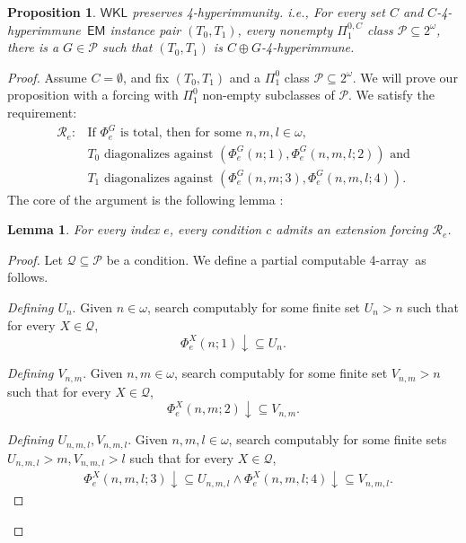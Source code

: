 \documentclass{amsart}
\newtheorem{lemma}[theorem]{Lemma}
\newtheorem{proposition}[theorem]{Proposition}
\theoremstyle{definition}
\theoremstyle{remark}
\numberwithin{equation}{section}
\theoremstyle{noparens}
\def\msf{\mathsf}
\def\mcal{\mathcal}
\def\iatfs{array}
\def\iatfshyp{4-hyperimmune}
\def\propiatfshyp{4-hyperimmunity}
\def\diagonalagainst{diagonalizes against}
\begin{document}
\begin{proposition}\label{uemprop2}
$\msf{WKL}$ preserves \propiatfshyp. i.e.,
For every set $C$ and $C$-\iatfshyp\ $\msf{EM}$
instance pair $(T_0,T_1)$,
 every nonempty $\Pi_1^{0,C}$ class
$\mcal{P}\subseteq 2^\omega$,
there is a $G\in\mcal{P}$ such that
$(T_0,T_1)$ is $C\oplus G$-\iatfshyp.

\end{proposition}
\begin{proof}
Assume $C = \emptyset$, and fix $(T_0, T_1)$ and a $\Pi^0_1$ class $\mcal{P} \subseteq 2^\omega$.
We will prove our proposition with a forcing with $\Pi^0_1$ non-empty subclasses of $\mcal{P}$. We satisfy the requirement:
\begin{align}\nonumber
\mcal{R}_e: & \text{If }\Phi_e^G\text{ is total, then for
some $n,m,l \in \omega$, }\\ \nonumber
& T_0\text{ \diagonalagainst\ $(\Phi_e^G(n;1),\Phi_e^G(n,m,l;2))$ and}\\ \nonumber
&\text{$T_1$ \diagonalagainst\ $(\Phi_e^G(n,m;3),\Phi_e^G(n,m,l;4))$.}
\end{align}
The core of the argument is the following lemma :

\begin{lemma}\label{lem:uemprop2-preserve}
For every index $e$, every condition $c$
 admits an extension forcing $\mcal{R}_e$.
\end{lemma}
\begin{proof}
Let $\mcal{Q} \subseteq \mcal{P}$ be a condition.
We  define %
 a partial computable 4-\iatfs\ as follows.
\bigskip

\emph{Defining $U_n$}.
Given $n \in \omega$, search computably for some
finite set $U_n>n$ such that
for every $X\in \mcal{Q}$,
$$\Phi_e^X(n;1)\downarrow\subseteq U_n.$$

\emph{Defining $V_{n,m}$}.
 Given $n,m\in\omega$, search computably for some
 finite set $  V_{n,m}>n$
such that
for every $X\in \mcal{Q}$,
$$
\Phi_{e}^{X}(n, m;2) \downarrow \subseteq V_{n,m}.
$$



 \emph{Defining $U_{n,m,l},V_{n,m,l}$}.
  Given $n,m,l\in\omega$, search computably for some
 finite sets $U_{n,m,l}>m, V_{n,m,l}>l$
 such that
for every $X\in \mcal{Q}$,
\begin{align}\nonumber
& \Phi_e^X(n,m,l;3)\downarrow\subseteq U_{n,m,l}\wedge
\Phi_e^X(n,m,l;4)\downarrow\subseteq V_{n,m,l}.
\end{align}



\end{proof}
\end{proof}
\end{document}
